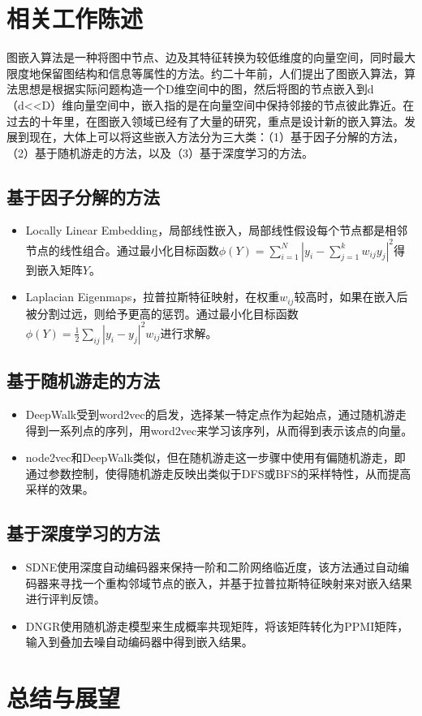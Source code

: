 \documentclass{ctexart}
\begin{document}
\section{相关工作陈述}

图嵌入算法是一种将图中节点、边及其特征转换为较低维度的向量空间，同时最大限度地保留图结构和信息等属性的方法。约二十年前，人们提出了图嵌入算法，算法思想是根据实际问题构造一个D维空间中的图，然后将图的节点嵌入到d（d<<D）维向量空间中，嵌入指的是在向量空间中保持邻接的节点彼此靠近。在过去的十年里，在图嵌入领域已经有了大量的研究，重点是设计新的嵌入算法。发展到现在，大体上可以将这些嵌入方法分为三大类：（1）基于因子分解的方法，（2）基于随机游走的方法，以及（3）基于深度学习的方法\cite{goyal2018graph}。

\subsection{基于因子分解的方法}

\begin{itemize}
    \item Locally Linear Embedding，局部线性嵌入，局部线性假设每个节点都是相邻节点的线性组合。通过最小化目标函数$\phi(Y)=\sum_{i=1}^N|y_i-\sum_{j=1}^kw_{ij}y_j|^2$得到嵌入矩阵$Y$。
    \item Laplacian Eigenmaps，拉普拉斯特征映射，在权重$w_{ij}$较高时，如果在嵌入后被分割过远，则给予更高的惩罚。通过最小化目标函数$\phi(Y)=\frac{1}{2}\sum_{ij} |y_i-y_j|^2w_{ij}$进行求解。
\end{itemize}

\subsection{基于随机游走的方法}

\begin{itemize}
    \item DeepWalk受到word2vec的启发，选择某一特定点作为起始点，通过随机游走得到一系列点的序列，用word2vec来学习该序列，从而得到表示该点的向量。
    \item node2vec和DeepWalk类似，但在随机游走这一步骤中使用有偏随机游走，即通过参数控制，使得随机游走反映出类似于DFS或BFS的采样特性，从而提高采样的效果。
\end{itemize}

\subsection{基于深度学习的方法}
\begin{itemize}
    \item SDNE使用深度自动编码器来保持一阶和二阶网络临近度，该方法通过自动编码器来寻找一个重构邻域节点的嵌入，并基于拉普拉斯特征映射来对嵌入结果进行评判反馈。
    \item DNGR使用随机游走模型来生成概率共现矩阵，将该矩阵转化为PPMI矩阵，输入到叠加去噪自动编码器中得到嵌入结果。
\end{itemize}

\section{总结与展望}


\end{document}

